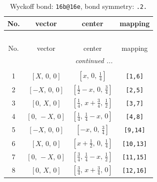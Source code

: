 \documentclass[fleqn,8pt]{jsarticle}
\begin{document}
\begin{longtable}{cccc}
\caption{Wyckoff bond: {\tt 16b@16e}, bond symmetry: {\tt .2.}}
 \\
 \hline \hline
No. & vector & center & mapping \\ \hline \endfirsthead

\multicolumn{3}{l}{\tablename\ \thetable{}} \\
 \hline \hline
No. & vector & center & mapping \\ \hline \endhead

 \hline \hline
\multicolumn{3}{r}{\footnotesize\it continued ...} \\ \endfoot

 \hline \hline
\multicolumn{3}{r}{} \\ \endlastfoot

1 & $\left[ X,\, 0,\, 0 \right]$ & $\left[ x,\, 0,\, \frac{1}{4} \right]$ & {\tt [1,6]} \\ \hline
2 & $\left[ - X,\, 0,\, 0 \right]$ & $\left[ \frac{1}{2} - x,\, 0,\, \frac{3}{4} \right]$ & {\tt [2,5]} \\ \hline
3 & $\left[ 0,\, X,\, 0 \right]$ & $\left[ \frac{1}{4},\, x + \frac{3}{4},\, \frac{1}{2} \right]$ & {\tt [3,7]} \\ \hline
4 & $\left[ 0,\, - X,\, 0 \right]$ & $\left[ \frac{1}{4},\, \frac{1}{4} - x,\, 0 \right]$ & {\tt [4,8]} \\ \hline
5 & $\left[ - X,\, 0,\, 0 \right]$ & $\left[ - x,\, 0,\, \frac{3}{4} \right]$ & {\tt [9,14]} \\ \hline
6 & $\left[ X,\, 0,\, 0 \right]$ & $\left[ x + \frac{1}{2},\, 0,\, \frac{1}{4} \right]$ & {\tt [10,13]} \\ \hline
7 & $\left[ 0,\, - X,\, 0 \right]$ & $\left[ \frac{3}{4},\, \frac{1}{4} - x,\, \frac{1}{2} \right]$ & {\tt [11,15]} \\ \hline
8 & $\left[ 0,\, X,\, 0 \right]$ & $\left[ \frac{3}{4},\, x + \frac{3}{4},\, 0 \right]$ & {\tt [12,16]} \\
\end{longtable}
\renewcommand{\arraystretch}{1.2}
\end{document}
